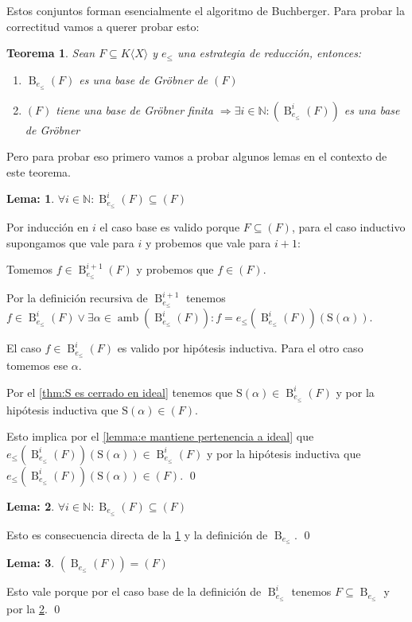 \documentclass{report}
\theoremstyle{customstyle}
\newtheorem{theorem}{Teorema}[chapter]
\newtheorem{lemma}{Lema:}[chapter]
\renewenvironment{proof}[1][\proofname]{{\bfseries #1: }}{\qed} %
\theoremstyle{factstyle}
\DeclareMathOperator{\amb}{amb}
\renewcommand{\S}{\text{S}}
\DeclareMathOperator{\B}{B}
\begin{document}
Estos conjuntos forman esencialmente el algoritmo de Buchberger. Para probar la correctitud vamos a querer probar esto:

\begin{theorem}\label{thm:Buchberger correctitud}
Sean $F ⊆ K⟨X⟩$ y $e_≤$ una estrategia de reducción, entonces:
\begin{enumerate}
\item $\B_{e_≤}(F)$ es una base de Gröbner de $(F)$
\item $(F)$ tiene una base de Gröbner finita $⇒ ∃i ∈ ℕ : (\B_{e_≤}^i(F))$ es una base de Gröbner
\end{enumerate}
\end{theorem}

Pero para probar eso primero vamos a probar algunos lemas en el contexto de este teorema.

\begin{lemma}\label{lemma:Buchberger correctitud:3}
$∀i ∈ ℕ : \B_{e_≤}^{i}(F) ⊆ (F)$
\end{lemma}
\begin{proof}
Por inducción en $i$ el caso base es valido porque $F ⊆ (F)$, para el caso inductivo supongamos que vale para $i$ y probemos que vale para $i + 1$:

Tomemos $f ∈ \B_{e_≤}^{i + 1}(F)$ y probemos que $f ∈ (F)$.

Por la definición recursiva de $\B_{e_≤}^{i + 1}$ tenemos $f ∈ \B_{e_≤}^i(F) ∨ ∃α ∈ \amb(\B_{e_≤}^i(F)) : f = e_≤(\B_{e_≤}^i(F))(\S(α))$.

El caso $f ∈ \B_{e_≤}^i(F)$ es valido por hipótesis inductiva. Para el otro caso tomemos ese $α$.

Por el \cref{thm:S es cerrado en ideal} tenemos que $\S(α) ∈ \B_{e_≤}^i(F)$ y por la hipótesis inductiva que $\S(α) ∈ (F)$.

Esto implica por el \cref{lemma:e mantiene pertenencia a ideal} que $e_≤(\B_{e_≤}^i(F))(\S(α)) ∈ \B_{e_≤}^i(F)$ y por la hipótesis inductiva que $e_≤(\B_{e_≤}^i(F))(\S(α)) ∈ (F)$.
\end{proof}

\begin{lemma}\label{lemma:Buchberger correctitud:4}
$∀i ∈ ℕ : \B_{e_≤}(F) ⊆ (F)$
\end{lemma}
\begin{proof}
Esto es consecuencia directa de la \cref{lemma:Buchberger correctitud:3} y la definición de $\B_{e_≤}$.
\end{proof}

\begin{lemma}\label{lemma:Buchberger correctitud:5}
$(\B_{e_≤}(F)) = (F)$
\end{lemma}
\begin{proof}
Esto vale porque por el caso base de la definición de $\B_{e_≤}^i$ tenemos $F ⊆ \B_{e_≤}$ y por la \cref{lemma:Buchberger correctitud:4}.
\end{proof}
\end{document}
